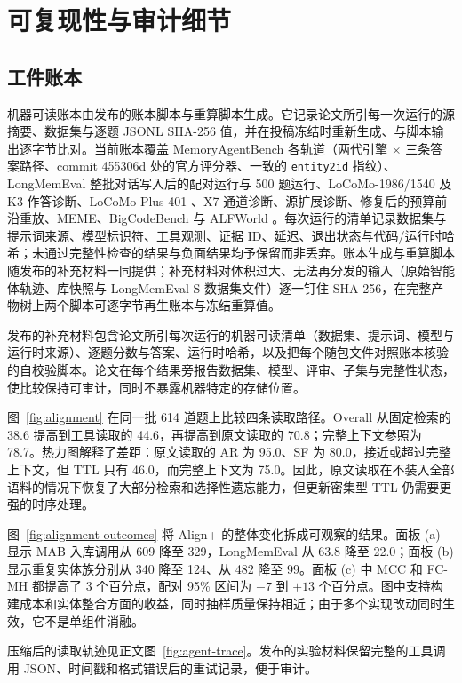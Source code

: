 \section{可复现性与审计细节}

\subsection{工件账本}
\label{app:ledger}

机器可读账本由发布的账本脚本与重算脚本生成。它记录论文所引每一次运行的源摘要、数据集与逐题 JSONL SHA-256 值，并在投稿冻结时重新生成、与脚本输出逐字节比对。当前账本覆盖 MemoryAgentBench 各轨道（两代引擎 $\times$ 三条答案路径、commit 455306d 处的官方评分器、一致的 \texttt{entity2id} 指纹）、LongMemEval 整批对话写入后的配对运行与 500 题运行、LoCoMo-1986/1540 及 K3 作答诊断、LoCoMo-Plus-401 \citep{li-etal-2026-locomo}、X7 通道诊断、源扩展诊断、修复后的预算前沿重放、MEME、BigCodeBench \citep{zhuo2024bigcodebench} 与 ALFWorld \citep{shridhar2021alfworld}。每次运行的清单记录数据集与提示词来源、模型标识符、工具观测、证据 ID、延迟、退出状态与代码/运行时哈希；未通过完整性检查的结果与负面结果均予保留而非丢弃。账本生成与重算脚本随发布的补充材料一同提供；补充材料对体积过大、无法再分发的输入（原始智能体轨迹、库快照与 LongMemEval-S 数据集文件）逐一钉住 SHA-256，在完整产物树上两个脚本可逐字节再生账本与冻结重算值。

发布的补充材料包含论文所引每次运行的机器可读清单（数据集、提示词、模型与运行时来源）、逐题分数与答案、运行时哈希，以及把每个随包文件对照账本核验的自校验脚本。论文在每个结果旁报告数据集、模型、评审、子集与完整性状态，使比较保持可审计，同时不暴露机器特定的存储位置。



图~\ref{fig:alignment} 在同一批 614 道题上比较四条读取路径。Overall 从固定检索的 38.6 提高到工具读取的 44.6，再提高到原文读取的 70.8；完整上下文参照为 78.7。热力图解释了差距：原文读取的 AR 为 95.0、SF 为 80.0，接近或超过完整上下文，但 TTL 只有 46.0，而完整上下文为 75.0。因此，原文读取在不装入全部语料的情况下恢复了大部分检索和选择性遗忘能力，但更新密集型 TTL 仍需要更强的时序处理。

图~\ref{fig:alignment-outcomes} 将 Align+ 的整体变化拆成可观察的结果。面板 (a) 显示 MAB 入库调用从 609 降至 329，LongMemEval 从 63.8 降至 22.0；面板 (b) 显示重复实体族分别从 340 降至 124、从 482 降至 99。面板 (c) 中 MCC 和 FC-MH 都提高了 3 个百分点，配对 95\% 区间为 $-7$ 到 $+13$ 个百分点。图中支持构建成本和实体整合方面的收益，同时抽样质量保持相近；由于多个实现改动同时生效，它不是单组件消融。

压缩后的读取轨迹见正文图~\ref{fig:agent-trace}。发布的实验材料保留完整的工具调用 JSON、时间戳和格式错误后的重试记录，便于审计。


